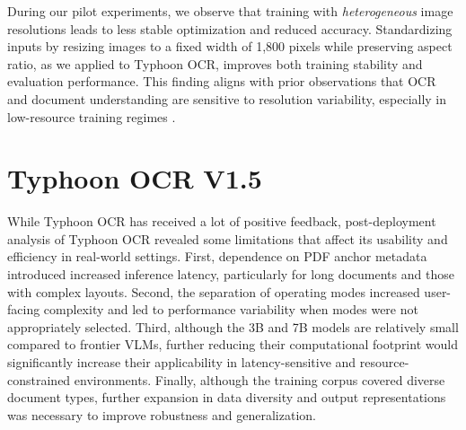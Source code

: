 \documentclass[]{typhoon} %
\begin{document}
During our pilot experiments, we observe that training with \emph{heterogeneous} image resolutions leads to less stable optimization and reduced accuracy. Standardizing inputs by resizing images to a fixed width of 1,800 pixels while preserving aspect ratio, as we applied to Typhoon OCR, improves both training stability and evaluation performance. This finding aligns with prior observations that OCR and document understanding are sensitive to resolution variability, especially in low-resource training regimes \citep{xiao2025scalinglanguagecentricomnimodalrepresentation}. 



\section{Typhoon OCR V1.5}

While Typhoon OCR has received a lot of positive feedback, post-deployment analysis of Typhoon OCR revealed some limitations that affect its usability and efficiency in real-world settings. First, dependence on PDF anchor metadata introduced increased inference latency, particularly for long documents and those with complex layouts. Second, the separation of operating modes increased user-facing complexity and led to performance variability when modes were not appropriately selected. Third, although the 3B and 7B models are relatively small compared to frontier VLMs, further reducing their computational footprint would significantly increase their applicability in latency-sensitive and resource-constrained environments. Finally, although the training corpus covered diverse document types, further expansion in data diversity and output representations was necessary to improve robustness and generalization.
\end{document}
